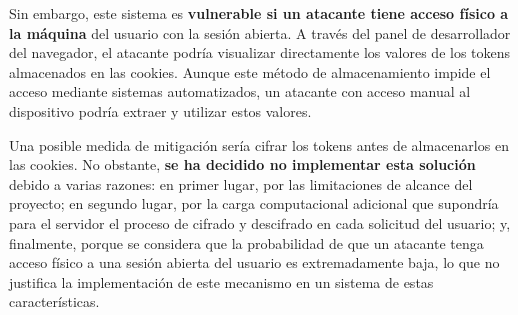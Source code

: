 Sin embargo, este sistema es \textbf{vulnerable si un atacante tiene acceso físico a la máquina} del usuario con la sesión abierta. A través del panel de desarrollador del navegador, el atacante podría visualizar directamente los valores de los tokens almacenados en las cookies. Aunque este método de almacenamiento impide el acceso mediante sistemas automatizados, un atacante con acceso manual al dispositivo podría extraer y utilizar estos valores.

Una posible medida de mitigación sería cifrar los tokens antes de almacenarlos en las cookies. No obstante, \textbf{se ha decidido no implementar esta solución} debido a varias razones: en primer lugar, por las limitaciones de alcance del proyecto; en segundo lugar, por la carga computacional adicional que supondría para el servidor el proceso de cifrado y descifrado en cada solicitud del usuario; y, finalmente, porque se considera que la probabilidad de que un atacante tenga acceso físico a una sesión abierta del usuario es extremadamente baja, lo que no justifica la implementación de este mecanismo en un sistema de estas características.







